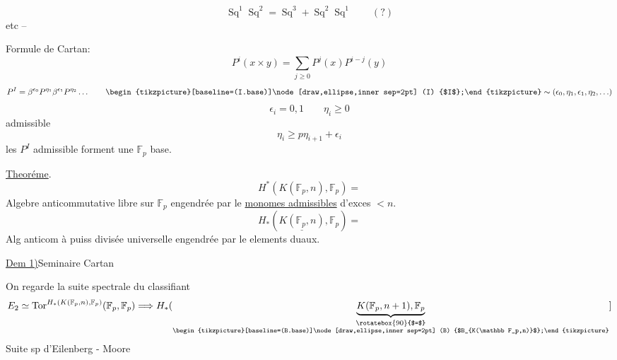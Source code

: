 \[
\operatorname{Sq}^1\operatorname{Sq}^2=\operatorname{Sq}^3+\operatorname{Sq}^2\operatorname{Sq}^1\qquad(?)
\]
etc --

Formule de Cartan:
\[
P^i(x\times y)=\sum_{j\geq0}P^j(x)P^{i-j}(y)
\]
\[
P^I=\beta^{\epsilon_0}P^{\eta_1}\beta^{\epsilon_1}P^{\eta_2}\ldots
\qquad\mathord{\begin{tikzpicture}[baseline=(I.base)]\node[draw,ellipse,inner sep=2pt] (I) {$I$};\end{tikzpicture}}\sim(\epsilon_0,\eta_1,\epsilon_1,\eta_2,\ldots)
\]
\[
\epsilon_i=0,1\qquad\eta_i\geq0
\]
admissible
\[
\eta_i\geq p\eta_{i+1}+\epsilon_i
\]
les $P^I$ admissible forment une $\mathbb F_p$ base.

\uline{Theoréme}.
\[
H^*(K(\mathbb F_p,n),\mathbb F_p)=
\]
Algebre anticommutative libre sur $\mathbb F_p$ engendrée par le \uline{monomes admissibles} d'exces $<n$.
\[
H_*(\underline{K(\mathbb F_p,n)},\mathbb F_p)=
\]
Alg anticom à puiss divisée universelle engendrée par le elements duaux.

\uline{Dem 1)}\quad Seminaire Cartan

On regarde la suite spectrale du classifiant
\[
E_2\simeq\operatorname{Tor}^{H_*(K(\mathbb F_p,n),\mathbb F_p)}(\mathbb F_p,\mathbb F_p)
\Longrightarrow H_*(\underbrace{K(\mathbb F_p,n+1),\mathbb F_p}_{\substack{\rotatebox{90}{$=$}\\\mathord{\begin{tikzpicture}[baseline=(B.base)]\node[draw,ellipse,inner sep=2pt] (B) {$B_{K(\mathbb F_p,n)}$};\end{tikzpicture}}}}]
\]
Suite sp d'Eilenberg - Moore

